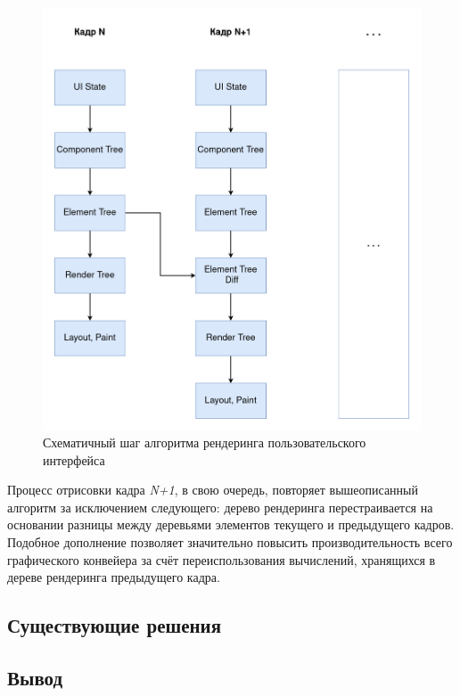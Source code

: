 \begin{figure}[h]
\centering
\includegraphics[width=\linewidth,height=0.9\linewidth,keepaspectratio]{resources/ui-render-pipeline.png}
\caption{Схематичный шаг алгоритма рендеринга пользовательского интерфейса}
\label{render-pipeline}
\end{figure}

Процесс отрисовки кадра \textit{N+1}, в свою очередь, повторяет
вышеописанный алгоритм за исключением следующего: дерево рендеринга
перестраивается на основании разницы между деревьями элементов текущего и
предыдущего кадров.
Подобное дополнение позволяет значительно повысить производительность
всего графического конвейера за счёт переиспользования вычислений,
хранящихся в дереве рендеринга предыдущего кадра.

\subsection{Существующие решения}

\subsection{Вывод}
